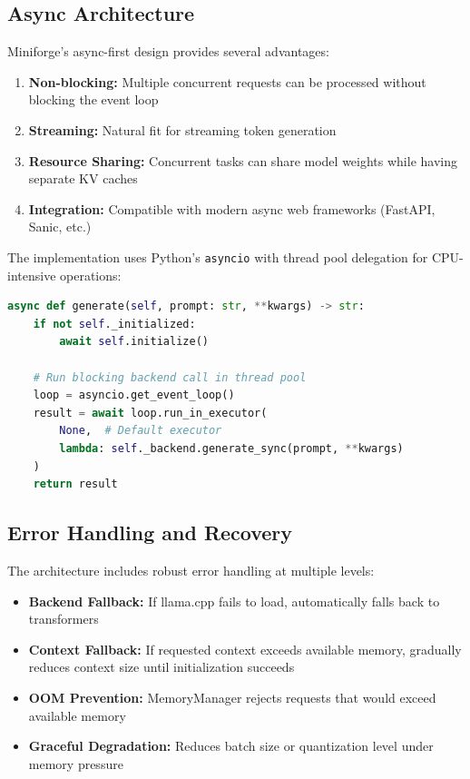 \subsection{Async Architecture}

Miniforge's async-first design provides several advantages:

\begin{enumerate}
    \item \textbf{Non-blocking:} Multiple concurrent requests can be processed without blocking the event loop
    \item \textbf{Streaming:} Natural fit for streaming token generation
    \item \textbf{Resource Sharing:} Concurrent tasks can share model weights while having separate KV caches
    \item \textbf{Integration:} Compatible with modern async web frameworks (FastAPI, Sanic, etc.)
\end{enumerate}

The implementation uses Python's \texttt{asyncio} with thread pool delegation for CPU-intensive operations:

\begin{lstlisting}[language=Python, caption=Async Pattern in Miniforge]
async def generate(self, prompt: str, **kwargs) -> str:
    if not self._initialized:
        await self.initialize()
    
    # Run blocking backend call in thread pool
    loop = asyncio.get_event_loop()
    result = await loop.run_in_executor(
        None,  # Default executor
        lambda: self._backend.generate_sync(prompt, **kwargs)
    )
    return result
\end{lstlisting}

\subsection{Error Handling and Recovery}

The architecture includes robust error handling at multiple levels:

\begin{itemize}
    \item \textbf{Backend Fallback:} If llama.cpp fails to load, automatically falls back to transformers
    \item \textbf{Context Fallback:} If requested context exceeds available memory, gradually reduces context size until initialization succeeds
    \item \textbf{OOM Prevention:} MemoryManager rejects requests that would exceed available memory
    \item \textbf{Graceful Degradation:} Reduces batch size or quantization level under memory pressure
\end{itemize}

